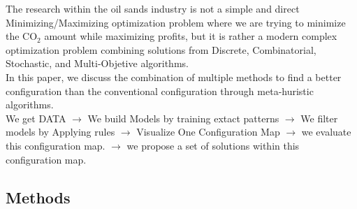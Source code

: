 \documentclass[12pt]{article}
\newcommand{\h}[1]{\colorbox{yellow}{#1}}
\begin{document}
The research within the oil sands industry is not a simple and direct Minimizing/Maximizing optimization problem where we are trying to minimize the CO$_2$ amount while maximizing profits, but it is rather a modern complex optimization problem combining solutions from Discrete, Combinatorial, Stochastic, and Multi-Objetive algorithms. \\



In this paper, we discuss the combination of multiple methods to find a better configuration than the conventional configuration through meta-huristic algorithms. \\

We get DATA $\rightarrow$ We build Models by training extact patterns $\rightarrow$ We filter models by Applying rules $\rightarrow$ Visualize One Configuration Map $\rightarrow$ we evaluate this configuration map.  $\rightarrow$ we propose a set of solutions within this configuration map. 


\subsection{Methods}
\end{document}
